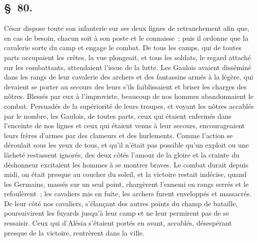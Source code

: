 \documentclass[french,twoside]{book} %
\begin{document}
\subsection[{§ 80.}]{ \textsc{§ 80.} }
\noindent César dispose toute son infanterie sur ses deux lignes de retranchement afin que, en cas de besoin, chacun soit à son poste et le connaisse ; puis il ordonne que la cavalerie sorte du camp et engage le combat. De tous les camps, qui de toutes parts occupaient les crêtes, la vue plongeait, et tous les soldats, le regard attaché sur les combattants, attendaient l’issue de la lutte. Les Gaulois avaient disséminé dans les rangs de leur cavalerie des archers et des fantassins armés à la légère, qui devaient se porter au secours des leurs s’ils faiblissaient et briser les charges des nôtres. Blessés par eux à l’improviste, beaucoup de nos hommes abandonnaient le combat. Persuadés de la supériorité de leurs troupes, et voyant les nôtres accablés par le nombre, les Gaulois, de toutes parts, ceux qui étaient enfermés dans l’enceinte de nos lignes et ceux qui étaient venus à leur secours, encourageaient leurs frères d’armes par des clameurs et des hurlements. Comme l’action se déroulait sous les yeux de tous, et qu’il n’était pas possible qu’un exploit ou une lâcheté restassent ignorés, des deux côtés l’amour de la gloire et la crainte du déshonneur excitaient les hommes à se montrer braves. Le combat durait depuis midi, on était presque au coucher du soleil, et la victoire restait indécise, quand les Germains, massés sur un seul point, chargèrent l’ennemi en rangs serrés et le refoulèrent ; les cavaliers mis en fuite, les archers furent enveloppés et massacrés. De leur côté nos cavaliers, s’élançant des autres points du champ de bataille, poursuivirent les fuyards jusqu’à leur camp et ne leur permirent pas de se ressaisir. Ceux qui d’Alésia s’étaient portés en avant, accablés, désespérant presque de la victoire, rentrèrent dans la ville.
\end{document}
